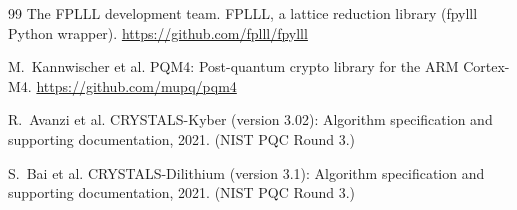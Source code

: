 \documentclass[11pt,a4paper]{article}
\begin{document}
\begin{thebibliography}{99}
 The FPLLL development team.
  FPLLL, a lattice reduction library (fpylll Python wrapper).
  \url{https://github.com/fplll/fpylll}

 M.~Kannwischer et al.
  PQM4: Post-quantum crypto library for the ARM Cortex-M4.
  \url{https://github.com/mupq/pqm4}

 R.~Avanzi et al.
  CRYSTALS-Kyber (version 3.02): Algorithm specification and supporting
  documentation, 2021. (NIST PQC Round 3.)

 S.~Bai et al.
  CRYSTALS-Dilithium (version 3.1): Algorithm specification and supporting
  documentation, 2021. (NIST PQC Round 3.)

\end{thebibliography}
\end{document}
